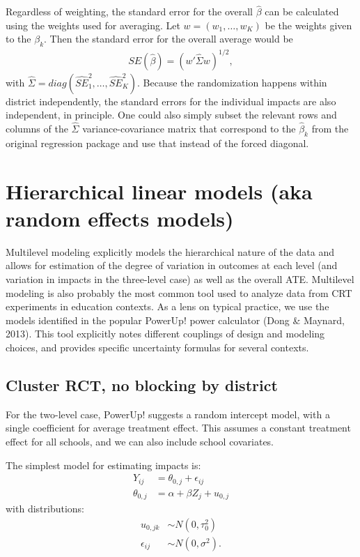 \documentclass[12pt]{article}
\begin{document}
Regardless of weighting, the standard error for the overall $\hat{\beta}$ can be calculated using the weights used for averaging.
Let $w = (w_1, \ldots, w_K)$ be the weights given to the $\beta_k$.
Then the standard error for the overall average would be
\begin{align*}
SE( \hat{\beta} ) = \left( w ' \widehat{\Sigma} w	\right)^{1/2},
\end{align*}
with $\widehat{\Sigma} = diag( \widehat{SE}_1^2, \ldots, \widehat{SE}_K^2 )$.
Because the randomization happens within district independently, the standard errors for the individual impacts are also independent, in principle.
One could also simply subset the relevant rows and columns of the $\widehat{\Sigma}$ variance-covariance matrix that correspond to the $\hat{\beta}_k$ from the original regression package and use that instead of the forced diagonal.





\section{Hierarchical linear models (aka random effects models)}
\label{hierarchical-linear-models-aka-random-effects-models}

Multilevel modeling explicitly models the hierarchical nature of the data and allows for estimation of the degree of variation in outcomes at each level (and variation in impacts in the three-level case) as well as the overall ATE.
Multilevel modeling is also probably the most common tool used to analyze data from CRT experiments in education contexts.
As a lens on typical practice, we use the models identified in the popular PowerUp! power calculator (Dong \& Maynard, 2013).
This tool explicitly notes different couplings of design and modeling choices, and provides specific uncertainty formulas for several contexts.




\subsection{Cluster RCT, no blocking by district}
For the two-level case, PowerUp! suggests a random intercept model, with
a single coefficient for average treatment effect. This assumes a
constant treatment effect for all schools, and we can also include
school covariates.

The simplest model for estimating impacts is:
\[
\begin{aligned}
Y_{ij} &=  \theta_{0,j} + \epsilon_{ij}\\
\theta_{0,j} &= \alpha + \beta Z_{j} + u_{0,j}
\end{aligned}
\]
with distributions: 
\[
\begin{aligned}
u_{0,jk} &\sim N\left(0, \tau^2_{0}\right)\\
\epsilon_{ij} &\sim N\left(0, \sigma^2 \right).
\end{aligned}
\]
\end{document}
